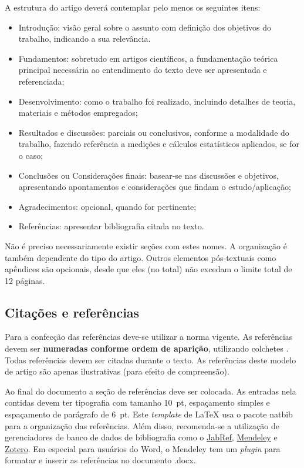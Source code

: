 \documentclass[12pt, a4paper, twoside, twocolumn]{article}
\begin{document}
A estrutura do artigo deverá contemplar pelo menos os seguintes itens:
%
\begin{itemize}[noitemsep,topsep=0ex] \itemsep=3pt
	\item Introdução: visão geral sobre o assunto com definição dos objetivos do trabalho, indicando a sua relevância.
	\item Fundamentos: sobretudo em artigos científicos, a fundamentação teórica principal necessária ao entendimento do texto deve ser apresentada e referenciada; 
	\item Desenvolvimento: como o trabalho foi realizado, incluindo detalhes de teoria, materiais e métodos empregados;
	\item Resultados e discussões: parciais ou conclusivos, conforme a modalidade do trabalho, fazendo referência a medições e cálculos estatísticos aplicados, se for o caso;
	\item Conclusões ou Considerações finais: basear-se nas discussões e objetivos, apresentando apontamentos e considerações que findam o estudo/aplicação;
	\item Agradecimentos: opcional, quando for pertinente;
	\item Referências: apresentar bibliografia citada no texto.
\end{itemize}
%
Não é preciso necessariamente existir seções com estes nomes. A organização é também dependente do tipo do artigo.
Outros elementos pós-textuais como apêndices são opcionais, desde que eles (no total) não excedam o limite total de 12 páginas. 

\subsection{Citações e referências}

Para a confecção das referências deve-se utilizar a norma vigente. As referências devem ser \textbf{numeradas conforme ordem de aparição}, utilizando colchetes \cite{Gomes-2015}. Todas referências devem ser citadas durante o texto. As referências \cite{Mareze-2017,Fonseca-2013,Brandao-2017,Gomes-2015,Oppenheim-2010,Muller-2001,Mareze-2019,Borges-2018,Ristow-2016} deste modelo de artigo são apenas ilustrativas (para efeito de compreensão).


Ao final do documento a seção de referências deve ser colocada. As entradas nela contidas devem ter tipografia com tamanho 10~pt, espaçamento simples e espaçamento de parágrafo de 6~pt. Este \textit{template} de \LaTeX\xspace usa o pacote {\ttfamily natbib} para a organização das referências. Além disso, recomenda-se a utilização de gerenciadores de banco de dados de bibliografia como o \href{http://www.jabref.org/}{JabRef}, \href{http://www.mendeley.com}{Mendeley} e \href{https://www.zotero.org/}{Zotero}. Em especial para usuários do Word, o Mendeley tem um \textit{plugin} para formatar e inserir as referências no documento .docx.
\end{document}
